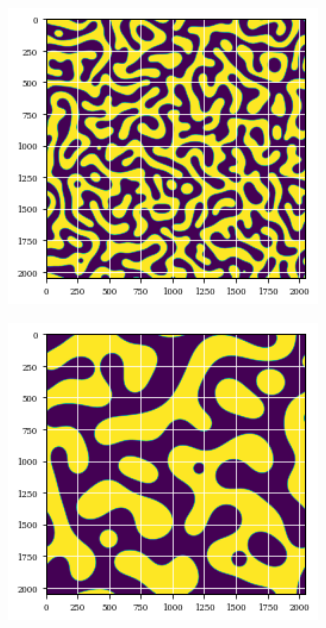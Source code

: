\documentclass[12pt, a4paper]{report}
\begin{document}
\begin{figure}[H]
\centering
\begin{subfigure}{.32\textwidth}
  \centering
  \includegraphics[width=0.9\textwidth]{Pictures/MSFeatures/ConvexMicroEvolStart.png}
  \label{img:microstrImg}
\end{subfigure}
\begin{subfigure}{.32\textwidth}
  \centering
  \includegraphics[width=0.9\textwidth]{Pictures/MSFeatures/ConvexMicroExalMiddle.png}

\end{subfigure}
\end{figure}
\end{document}
